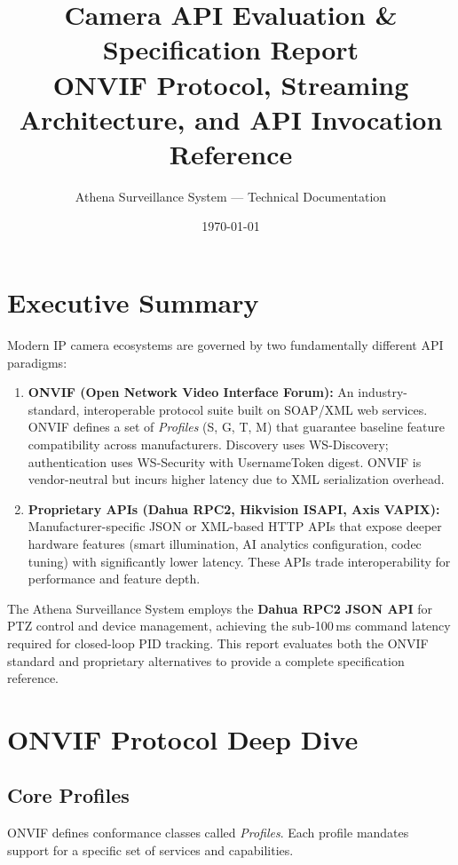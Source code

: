 \documentclass[12pt,a4paper]{article}
\title{\textbf{Camera API Evaluation \& Specification Report}\\[0.3em]
\large ONVIF Protocol, Streaming Architecture, and API Invocation Reference}
\author{Athena Surveillance System --- Technical Documentation}
\date{\today}
\begin{document}
\maketitle
\tableofcontents
\newpage

\section{Executive Summary}
Modern IP camera ecosystems are governed by two fundamentally different API paradigms:

\begin{enumerate}[label=\textbf{\arabic*.}]
    \item \textbf{ONVIF (Open Network Video Interface Forum):} An industry-standard, interoperable protocol suite built on SOAP/XML web services. ONVIF defines a set of \emph{Profiles} (S, G, T, M) that guarantee baseline feature compatibility across manufacturers. Discovery uses WS-Discovery; authentication uses WS-Security with UsernameToken digest. ONVIF is vendor-neutral but incurs higher latency due to XML serialization overhead.

    \item \textbf{Proprietary APIs (Dahua RPC2, Hikvision ISAPI, Axis VAPIX):} Manufacturer-specific JSON or XML-based HTTP APIs that expose deeper hardware features (smart illumination, AI analytics configuration, codec tuning) with significantly lower latency. These APIs trade interoperability for performance and feature depth.
\end{enumerate}

The Athena Surveillance System employs the \textbf{Dahua RPC2 JSON API} for PTZ control and device management, achieving the sub-100\,ms command latency required for closed-loop PID tracking. This report evaluates both the ONVIF standard and proprietary alternatives to provide a complete specification reference.


\section{ONVIF Protocol Deep Dive}

\subsection{Core Profiles}
ONVIF defines conformance classes called \emph{Profiles}. Each profile mandates support for a specific set of services and capabilities.
\end{document}
